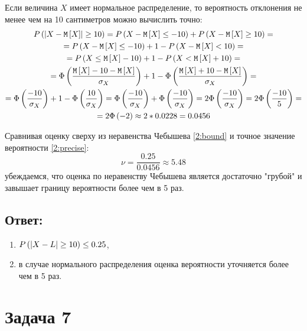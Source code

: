 Если величина $X$ имеет нормальное распределение, то вероятность отклонения не менее чем на 10 сантиметров можно вычислить точно:
\begin{multline}
    \label{2:precise}
    P \left ( \left | X - \mathtt{M} \left [ X \right ] \right | \ge 10 \right )
    = P \left ( X - \mathtt{M} \left [ X \right ] \le - 10 \right ) + P \left (  X - \mathtt{M} \left [ X \right ] \ge 10 \right ) = \\
    = P \left ( X - \mathtt{M} \left [ X \right ] \le - 10 \right ) + 1 - P \left (  X - \mathtt{M} \left [ X \right ] < 10 \right ) = \\
    = P \left ( X \le \mathtt{M} \left [ X \right ] - 10 \right ) + 1 - P \left (  X < \mathtt{M} \left [ X \right ] + 10 \right ) = \\
    = \Phi \left ( \frac{\mathtt{M} \left [ X \right ] - 10 - \mathtt{M} \left [ X \right ]}{\sigma_X} \right ) + 1 - \Phi \left ( \frac{\mathtt{M} \left [ X \right ] + 10 - \mathtt{M} \left [ X \right ]}{\sigma_X} \right ) = \\
    = \Phi \left ( \frac{- 10}{\sigma_X} \right ) + 1 - \Phi \left ( \frac{10}{\sigma_X} \right )
    = \Phi \left ( \frac{- 10}{\sigma_X} \right ) + \Phi \left ( \frac{- 10}{\sigma_X} \right )
    = 2 \Phi \left ( \frac{- 10}{\sigma_X} \right )
    = 2 \Phi \left ( \frac{- 10}{5} \right ) = \\
    = 2 \Phi \left ( - 2 \right )
    \approx 2 * 0.0228
    = 0.0456
\end{multline}

Сравнивая оценку сверху из неравенства Чебышева \eqref{2:bound} и точное значение вероятности \eqref{2:precise}:
\begin{equation}
    \nu = \frac{0.25}{0.0456} \approx 5.48
\end{equation}
убеждаемся, что оценка по неравенству Чебышева является достаточно "грубой"{} и завышает границу вероятности более чем в 5 раз.
\subsection*{Ответ:}
\begin{enumerate}
    \item $ P \left (  \left | X - L \right | \ge 10  \right ) \le 0.25 $,
    \item в случае нормального распределения оценка вероятности уточняется более чем в 5 раз.
\end{enumerate}

\section*{Задача 7}

